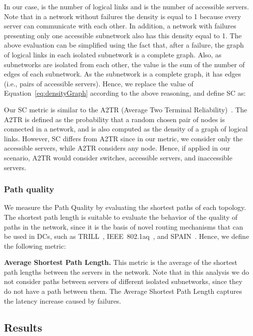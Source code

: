 In our case,  is the number of logical links and  is the number of accessible servers. Note that in a network without failures the density is equal to 1 because every server can communicate with each other. In addition, a network with failures presenting only one accessible subnetwork also has this density equal to 1. The above evaluation can be simplified using the fact that, after a failure, the graph of logical links in each isolated subnetwork is a complete graph. Also, as subnetworks are isolated from each other, the value  is the sum of the number of edges of each subnetwork. As the subnetwork is a complete graph, it has  edges (i.e., pairs of accessible servers). Hence, we replace the value  of Equation~\ref{eq:densityGraph} according to the above reasoning, and define SC as:


Our SC metric is similar to the A2TR (Average Two Terminal Reliability)~\cite{neumayer2010Network}. The A2TR is defined as the probability that a random chosen pair of nodes is connected in a network, and is also computed as the density of a graph of logical links. However, SC differs from A2TR since in our metric, we consider only the accessible servers, while A2TR considers any node. Hence, if applied in our scenario, A2TR would consider switches, accessible servers, and inaccessible servers.
\subsubsection{Path quality}
\label{sec:pathQuality}
We measure the Path Quality by evaluating the shortest paths of each topology.
The shortest path length is suitable to evaluate the behavior of the quality of paths in the network, since it is the basis of novel routing mechanisms that can be used in DCs, such as TRILL~\cite{rfc5556}, IEEE~802.1aq~\cite{spb}, and SPAIN~\cite{mudigonda2010spain}.
Hence, we define the following metric:

\textbf{Average Shortest Path Length.} This metric is the average of the shortest path lengths between the servers in the network. Note that in this analysis we do not consider paths between servers of different isolated subnetworks, since they do not have a path between them. The Average Shortest Path Length captures the latency increase caused by failures.
\subsection{Results}
\label{sec:survivalTimeResults} 

